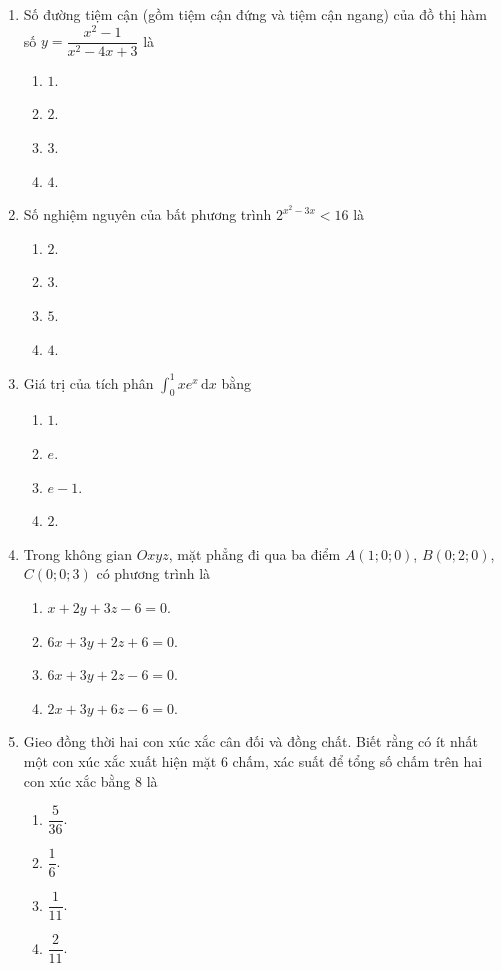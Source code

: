 \documentclass[12pt,a4paper]{article}
\begin{document}
\begin{enumerate}[label=\textbf{Câu \arabic*:}, leftmargin=*]

\item Số đường tiệm cận (gồm tiệm cận đứng và tiệm cận ngang) của đồ thị hàm số $y = \dfrac{x^2 - 1}{x^2 - 4x + 3}$ là
\begin{enumerate}[label=\Alph*.]
    \item $1$.
    \item $2$.
    \item $3$.
    \item $4$.
\end{enumerate}

\item Số nghiệm nguyên của bất phương trình $2^{x^2 - 3x} < 16$ là
\begin{enumerate}[label=\Alph*.]
    \item $2$.
    \item $3$.
    \item $5$.
    \item $4$.
\end{enumerate}

\item Giá trị của tích phân $\displaystyle \int_0^1 x e^x\,\mathrm{d}x$ bằng
\begin{enumerate}[label=\Alph*.]
    \item $1$.
    \item $e$.
    \item $e - 1$.
    \item $2$.
\end{enumerate}

\item Trong không gian $Oxyz$, mặt phẳng đi qua ba điểm $A(1; 0; 0)$, $B(0; 2; 0)$, $C(0; 0; 3)$ có phương trình là
\begin{enumerate}[label=\Alph*.]
    \item $x + 2y + 3z - 6 = 0$.
    \item $6x + 3y + 2z + 6 = 0$.
    \item $6x + 3y + 2z - 6 = 0$.
    \item $2x + 3y + 6z - 6 = 0$.
\end{enumerate}

\item Gieo đồng thời hai con xúc xắc cân đối và đồng chất. Biết rằng có ít nhất một con xúc xắc xuất hiện mặt $6$ chấm, xác suất để tổng số chấm trên hai con xúc xắc bằng $8$ là
\begin{enumerate}[label=\Alph*.]
    \item $\dfrac{5}{36}$.
    \item $\dfrac{1}{6}$.
    \item $\dfrac{1}{11}$.
    \item $\dfrac{2}{11}$.
\end{enumerate}


\end{enumerate}
\end{document}
